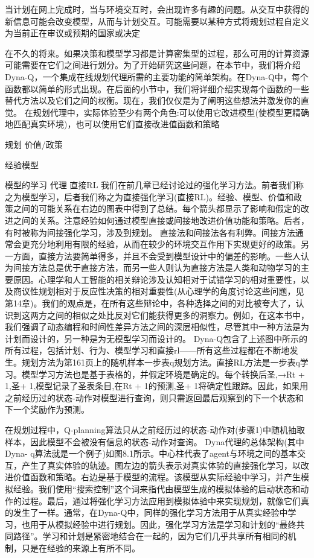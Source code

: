 当计划在网上完成时，当与环境交互时，会出现许多有趣的问题。从交互中获得的新信息可能会改变模型，从而与计划交互。可能需要以某种方式将规划过程自定义为当前正在审议或预期的国家或决定

在不久的将来。如果决策和模型学习都是计算密集型的过程，那么可用的计算资源可能需要在它们之间进行划分。为了开始研究这些问题，在本节中，我们将介绍Dyna-Q，一个集成在线规划代理所需的主要功能的简单架构。在Dyna-Q中，每个函数都以简单的形式出现。在后面的小节中，我们将详细介绍实现每个函数的一些替代方法以及它们之间的权衡。现在，我们仅仅是为了阐明这些想法并激发你的直觉。
在规划代理中，实际体验至少有两个角色:可以使用它改进模型(使模型更精确地匹配真实环境)，也可以使用它们直接改进值函数和策略

规划
价值/政策

经验模型

模型的学习
代理
直接RL
我们在前几章已经讨论过的强化学习方法。前者我们称之为模型学习，后者我们称之为直接强化学习(直接RL)。经验、模型、价值和政策之间的可能关系在右边的图表中得到了总结。每个箭头都显示了影响和假定的改进之间的关系。注意经验如何通过模型直接或间接地改进价值功能和策略。后者，有时被称为间接强化学习，涉及到规划。
直接法和间接法各有利弊。间接方法通常会更充分地利用有限的经验，从而在较少的环境交互作用下实现更好的政策。另一方面，直接方法要简单得多，并且不会受到模型设计中的偏差的影响。一些人认为间接方法总是优于直接方法，而另一些人则认为直接方法是人类和动物学习的主要原因。心理学和人工智能的相关辩论涉及认知相对于试错学习的相对重要性，以及商议性规划相对于反应性决策的相对重要性(从心理学的角度讨论这些问题，见第14章)。我们的观点是，在所有这些辩论中，各种选择之间的对比被夸大了，认识到这两方之间的相似之处比反对它们能获得更多的洞察力。例如，在这本书中，我们强调了动态编程和时间性差异方法之间的深层相似性，尽管其中一种方法是为计划而设计的，另一种是为无模型学习而设计的。
Dyna-Q包含了上述图中所示的所有过程，包括计划、行为、模型学习和直接rl——所有这些过程都在不断地发生。规划方法为第161页上的随机样本一步表q规划方法。直接RL方法是一步表q学习。模型学习方法也是基于表格的，并假定环境是确定的。每个转换后圣,→Rt + 1,圣+ 1,模型记录了圣表条目,在Rt + 1的预测,圣+ 1将确定性跟踪。因此，如果用之前经历过的状态-动作对模型进行查询，则只需返回最后观察到的下一个状态和下一个奖励作为预测。

在规划过程中，Q-planning算法只从之前经历过的状态-动作对(步骤1)中随机抽取样本，因此模型不会被没有信息的状态-动作对查询。
Dyna代理的总体架构(其中Dyna- q算法就是一个例子)如图8.1所示。中心柱代表了agent与环境之间的基本交互，产生了真实体验的轨迹。图左边的箭头表示对真实体验的直接强化学习，以改进价值函数和策略。右边是基于模型的流程。该模型从实际经验中学习，并产生模拟经验。我们使用“搜索控制”这个词来指代由模型生成的模拟体验的启动状态和动作的过程。最后，通过将强化学习方法应用到模拟体验中来实现规划，就像它们真的发生了一样。通常，在Dyna-Q中，同样的强化学习方法用于从真实经验中学习，也用于从模拟经验中进行规划。因此，强化学习方法是学习和计划的“最终共同路径”。学习和计划是紧密地结合在一起的，因为它们几乎共享所有相同的机制，只是在经验的来源上有所不同。
 

